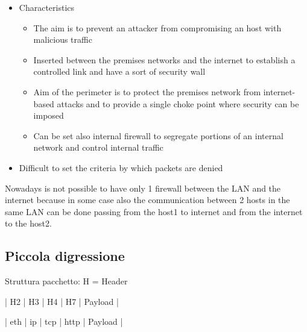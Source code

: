 \documentclass{article}
\begin{document}
\begin{itemize}
\begin{itemize}
    \item Characteristics
    \begin{itemize}
        \item The aim is to prevent an attacker from compromising an host with malicious traffic
        \item Inserted between the premises networks and the internet to establish a controlled link and have a sort of security wall
        \item Aim of the perimeter is to protect the premises network from internet-based attacks and to provide a single choke point where security can be imposed
        \item Can be set also internal firewall to segregate portions of an internal network and control internal traffic
    \end{itemize}
    \item Difficult to set the criteria by which packets are denied
    \end{itemize}
\end{itemize}

Nowadays is not possible to have only 1 firewall between the LAN and the internet because in some case also the communication between 2 hosts in the same LAN can be done passing from the host1 to internet and from the internet to the host2.

\subsection{Piccola digressione}
Struttura pacchetto:
H = Header

| H2 | H3 | H4 | H7 | Payload |

| eth | ip | tcp | http | Payload |
\end{document}
